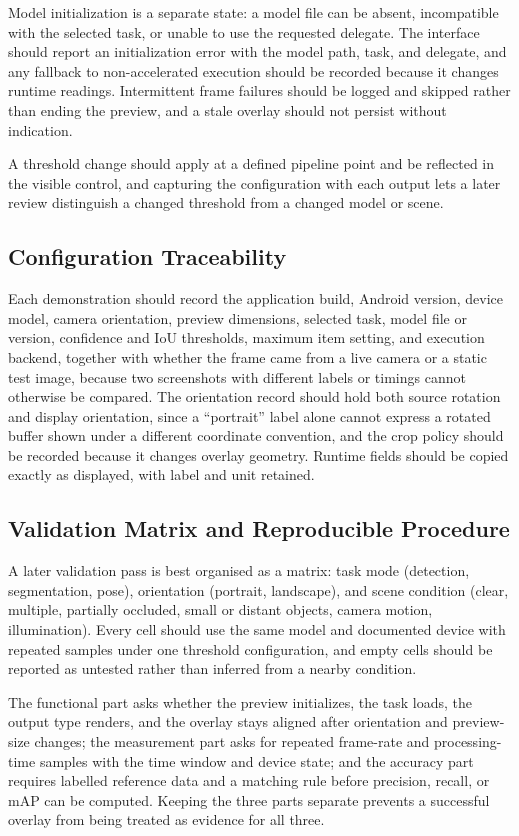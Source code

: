 Model initialization is a separate state: a model file can be absent, incompatible with the selected
task, or unable to use the requested delegate. The interface should report an initialization error with
the model path, task, and delegate, and any fallback to non-accelerated execution should be recorded
because it changes runtime readings. Intermittent frame failures should be logged and skipped rather
than ending the preview, and a stale overlay should not persist without indication.

A threshold change should apply at a defined pipeline point and be reflected in the visible control,
and capturing the configuration with each output lets a later review distinguish a changed threshold
from a changed model or scene.

\subsection{Configuration Traceability}
Each demonstration should record the application build, Android version, device model, camera
orientation, preview dimensions, selected task, model file or version, confidence and IoU thresholds,
maximum item setting, and execution backend, together with whether the frame came from a live camera
or a static test image, because two screenshots with different labels or timings cannot otherwise be
compared. The orientation record should hold both source rotation and display orientation, since a
``portrait'' label alone cannot express a rotated buffer shown under a different coordinate
convention, and the crop policy should be recorded because it changes overlay geometry. Runtime fields
should be copied exactly as displayed, with label and unit retained.

\subsection{Validation Matrix and Reproducible Procedure}
A later validation pass is best organised as a matrix: task mode (detection, segmentation, pose),
orientation (portrait, landscape), and scene condition (clear, multiple, partially occluded, small or
distant objects, camera motion, illumination). Every cell should use the same model and documented
device with repeated samples under one threshold configuration, and empty cells should be reported as
untested rather than inferred from a nearby condition.

The functional part asks whether the preview initializes, the task loads, the output type renders, and
the overlay stays aligned after orientation and preview-size changes; the measurement part asks for
repeated frame-rate and processing-time samples with the time window and device state; and the
accuracy part requires labelled reference data and a matching rule before precision, recall, or mAP
can be computed. Keeping the three parts separate prevents a successful overlay from being treated as
evidence for all three.

